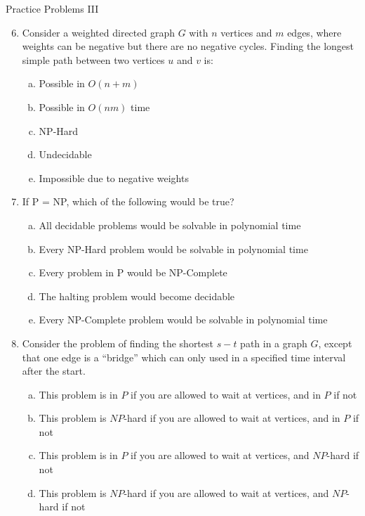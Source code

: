 \documentclass{beamer}
\begin{document}
\begin{frame}[t]{Practice Problems III}
    \begin{enumerate}
        \setcounter{enumi}{5}
        \item Consider a weighted directed graph $G$ with $n$ vertices and $m$ edges, where weights can be negative but there are no negative cycles. Finding the longest simple path between two vertices $u$ and $v$ is:
            \begin{enumerate}[(a)]
                \item Possible in $O(n+m)$
                \item Possible in $O(nm)$ time
                \item NP-Hard %
                \item Undecidable 
                \item Impossible due to negative weights
            \end{enumerate}
        \pause\item If P = NP, which of the following would be true?
            \begin{enumerate}[(a)]
                \item All decidable problems would be solvable in polynomial time
                \item Every NP-Hard problem would be solvable in polynomial time 
                \item Every problem in P would be NP-Complete
                \item The halting problem would become decidable
                \item Every NP-Complete problem would be solvable in polynomial time %
            \end{enumerate}
        \pause\item Consider the problem of finding the shortest $s-t$ path in a graph $G$, except that one edge is a ``bridge'' which can only used in a specified time interval after the start.
            \begin{enumerate}[(a)]
                \item This problem is in $P$ if you are allowed to wait at vertices, and in $P$ if not
                \item This problem is $NP$-hard if you are allowed to wait at vertices, and in $P$ if not
                \item This problem is in $P$ if you are allowed to wait at vertices, and $NP$-hard if not
                \item This problem is $NP$-hard if you are allowed to wait at vertices, and $NP$-hard if not
            \end{enumerate}
    \end{enumerate}
\end{frame}
\end{document}
